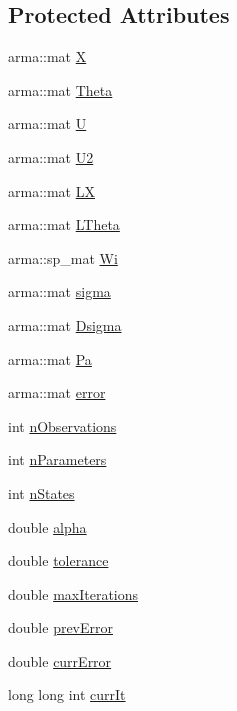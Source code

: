 \subsection*{Protected Attributes}
\begin{DoxyCompactItemize}
\item 
arma\+::mat \mbox{\hyperlink{classAbstractROUKF_afdb4deed00416489ced1729c22a317f2}{X}}
\item 
arma\+::mat \mbox{\hyperlink{classAbstractROUKF_a09460cd2349481e27e68718f47ad354b}{Theta}}
\item 
arma\+::mat \mbox{\hyperlink{classAbstractROUKF_a750d4ddf5b83c1ecd319a6b1a8f9ffb5}{U}}
\item 
arma\+::mat \mbox{\hyperlink{classAbstractROUKF_a98dd192be29bfa224abb3fe21f60ac92}{U2}}
\item 
arma\+::mat \mbox{\hyperlink{classAbstractROUKF_a5dfab9d5823117885e01db2e591eeb59}{LX}}
\item 
arma\+::mat \mbox{\hyperlink{classAbstractROUKF_a5c4be89d8f4d3c6ce73e05242bbd1d5e}{L\+Theta}}
\item 
arma\+::sp\+\_\+mat \mbox{\hyperlink{classAbstractROUKF_a0bb579dc353724d64ce50df76b5ecacb}{Wi}}
\item 
arma\+::mat \mbox{\hyperlink{classAbstractROUKF_a1d02b594a134c2644c0b64889c9ab34a}{sigma}}
\item 
arma\+::mat \mbox{\hyperlink{classAbstractROUKF_a7f0b59c793a213079124cfce6284e58c}{Dsigma}}
\item 
arma\+::mat \mbox{\hyperlink{classAbstractROUKF_ab3c7c4f238cedee2784a450cd10eb98b}{Pa}}
\item 
arma\+::mat \mbox{\hyperlink{classAbstractROUKF_a551d0b61b010efe7923358c93cbd0db5}{error}}
\item 
int \mbox{\hyperlink{classAbstractROUKF_a4f6403f7fd2fac691e4ac516f47c0a06}{n\+Observations}}
\item 
int \mbox{\hyperlink{classAbstractROUKF_a488f708dcdd66758cd879421cd454846}{n\+Parameters}}
\item 
int \mbox{\hyperlink{classAbstractROUKF_af9ce480feb5d97761f20fdd546878aff}{n\+States}}
\item 
double \mbox{\hyperlink{classAbstractROUKF_ada380355583bc96844c1f1bb0e202a40}{alpha}}
\item 
double \mbox{\hyperlink{classAbstractROUKF_aecf6562ecf3ea0bef0d4875cae682b11}{tolerance}}
\item 
double \mbox{\hyperlink{classAbstractROUKF_a268b49ab648ee8013b15ef5127d4fef1}{max\+Iterations}}
\item 
double \mbox{\hyperlink{classAbstractROUKF_a699ef3cc8c3c5fa650d065e6dd77e12a}{prev\+Error}}
\item 
double \mbox{\hyperlink{classAbstractROUKF_aaf3e4ce3407d3ca6ad1b06ba2592a6ce}{curr\+Error}}
\item 
long long int \mbox{\hyperlink{classAbstractROUKF_a8e7ff4187e5808a032fd97d1b8a024b3}{curr\+It}}
\end{DoxyCompactItemize}


